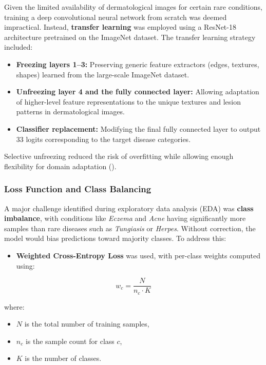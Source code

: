 \documentclass[
  12pt,
  oneside]{article}
\providecommand{\tightlist}{%
  \setlength{\itemsep}{0pt}\setlength{\parskip}{0pt}}
\begin{document}
Given the limited availability of dermatological images for certain rare
conditions, training a deep convolutional neural network from scratch
was deemed impractical. Instead, \textbf{transfer learning} was employed
using a ResNet-18 architecture pretrained on the ImageNet dataset. The
transfer learning strategy included:

\begin{itemize}
\tightlist
\item
  \textbf{Freezing layers 1--3:} Preserving generic feature extractors
  (edges, textures, shapes) learned from the large-scale ImageNet
  dataset.
\item
  \textbf{Unfreezing layer 4 and the fully connected layer:} Allowing
  adaptation of higher-level feature representations to the unique
  textures and lesion patterns in dermatological images.
\item
  \textbf{Classifier replacement:} Modifying the final fully connected
  layer to output 33 logits corresponding to the target disease
  categories.
\end{itemize}

Selective unfreezing reduced the risk of overfitting while allowing
enough flexibility for domain adaptation
().

\subsubsection{Loss Function and Class
Balancing}\label{loss-function-and-class-balancing-1}

A major challenge identified during exploratory data analysis (EDA) was
\textbf{class imbalance}, with conditions like \emph{Eczema} and
\emph{Acne} having significantly more samples than rare diseases such as
\emph{Tungiasis} or \emph{Herpes}. Without correction, the model would
bias predictions toward majority classes. To address this:

\begin{itemize}
\tightlist
\item
  \textbf{Weighted Cross-Entropy Loss} was used, with per-class weights
  computed using:
\end{itemize}

\[
w_c = \frac{N}{n_c \cdot K}
\]

where:

\begin{itemize}
\tightlist
\item
  \(N\) is the total number of training samples,
\item
  \(n_c\) is the sample count for class \(c\),
\item
  \(K\) is the number of classes.
\end{itemize}
\end{document}
